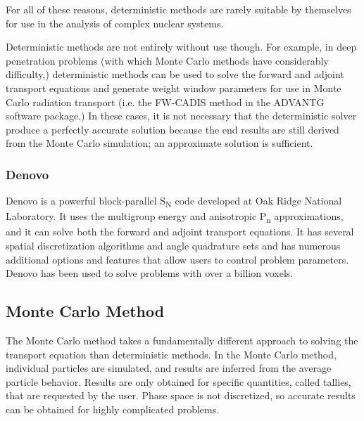 For all of these reasons, deterministic methods are rarely suitable by themselves for use in the analysis of complex nuclear systems.

Deterministic methods are not entirely without use though.
For example, in deep penetration problems (with which Monte Carlo methods have considerably difficulty,) deterministic methods can be used to solve the forward and adjoint transport equations and generate weight window parameters for use in Monte Carlo radiation transport (i.e. the FW-CADIS method \cite{fwcadis} in the ADVANTG \cite{advantg} software package.)
In these cases, it is not necessary that the deterministic solver produce a perfectly accurate solution because the end results are still derived from the Monte Carlo simulation; an approximate solution is sufficient.

\subsubsection{Denovo}
\label{sec:bg:rt:determ:denovo}

Denovo \cite{denovo} is a powerful block-parallel S\textsubscript{N} code developed at Oak Ridge National Laboratory.
It uses the multigroup energy and anisotropic P\textsubscript{n} approximations, and it can solve both the forward and adjoint transport equations.
It has several spatial discretization algorithms and angle quadrature sets and has numerous additional options and features that allow users to control problem parameters.
Denovo has been used to solve problems with over a billion voxels.

\subsection{Monte Carlo Method}
\label{sec:bg:rt:mc}

The Monte Carlo method takes a fundamentally different approach to solving the transport equation than deterministic methods.
In the Monte Carlo method, individual particles are simulated, and results are inferred from the average particle behavior.
Results are only obtained for specific quantities, called tallies, that are requested by the user.
Phase space is not discretized, so accurate results can be obtained for highly complicated problems.

